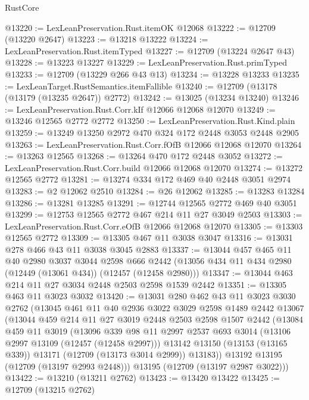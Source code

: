 \begin{lexlean}{RustCore}
\begin{coremodule}
@13220 := LexLeanPreservation.Rust.itemOK @12068
@13222 := @12709 (@13220 @2647)
@13223 := @13218 @13222
@13224 := LexLeanPreservation.Rust.itemTyped
@13227 := @12709 (@13224 @2647 @43)
@13228 := @13223 @13227
@13229 := LexLeanPreservation.Rust.primTyped
@13233 := @12709 (@13229 @266 @43 @13)
@13234 := @13228 @13233
@13235 := LexLeanTarget.RustSemantics.itemFallible
@13240 := @12709 (@13178 (@13179 (@13235 @2647)) @2772)
@13242 := @13025 (@13234 @13240)
@13246 := LexLeanPreservation.Rust.Corr.kIf @12066 @12068 @12070
@13249 := @13246 @12565 @2772 @2772
@13250 := LexLeanPreservation.Rust.Kind.plain
@13259 := @13249 @13250 @2972 @470 @324 @172 @2448 @3053 @2448 @2905
@13263 := LexLeanPreservation.Rust.Corr.fOfB @12066 @12068 @12070
@13264 := @13263 @12565
@13268 := @13264 @470 @172 @2448 @3052
@13272 := LexLeanPreservation.Rust.Corr.build @12066 @12068 @12070
@13274 := @13272 @12565 @2772
@13281 := @13274 @334 @172 @469 @40 @2448 @3051 @2974
@13283 := @2 @12062 @2510
@13284 := @26 @12062
@13285 := @13283 @13284
@13286 := @13281 @13285
@13291 := @12744 @12565 @2772 @469 @40 @3051
@13299 := @12753 @12565 @2772 @467 @214 @11 @27 @3049 @2503
@13303 := LexLeanPreservation.Rust.Corr.eOfB @12066 @12068 @12070
@13305 := @13303 @12565 @2772
@13309 := @13305 @467 @11 @3038 @3047
@13316 := @13031 @278 @466 @43 @11 @3038 @3045 @2883
@13337 := @13044
    @457
    @465
    @11
    @40
    @2980
    @3037
    @3044
    @2598
    @666
    @2442
    (@13056 @434 @11 @434 @2980 (@12449 (@13061 @434)) (@12457 (@12458 @2980)))
@13347 := @13044 @463 @214 @11 @27 @3034 @2448 @2503 @2598 @1539 @2442
@13351 := @13305 @463 @11 @3023 @3032
@13420 := @13031
    @280
    @462
    @43
    @11
    @3023
    @3030
    @2762
    (@13045
      @461
      @11
      @40
      @2936
      @3022
      @3029
      @2598
      @1489
      @2442
      @13067
      (@13044
        @459
        @214
        @11
        @27
        @3019
        @2448
        @2503
        @2598
        @1507
        @2442
        (@13084
          @459
          @11
          @3019
          (@13096
            @339
            @98
            @11
            @2997
            @2537
            @693
            @3014
            (@13106 @2997 @13109 (@12457 (@12458 @2997)))
            @13142
            @13150
            (@13153 (@13165 @339))
            @13171
            (@12709 (@13173 @3014 @2999))
            @13183))
        @13192
        @13195
        (@12709 (@13197 @2993 @2448)))
      @13195
      (@12709 (@13197 @2987 @3022)))
@13422 := @13210 (@13211 @2762)
@13423 := @13420 @13422
@13425 := @12709 (@13215 @2762)

\end{coremodule}
\end{lexlean}
